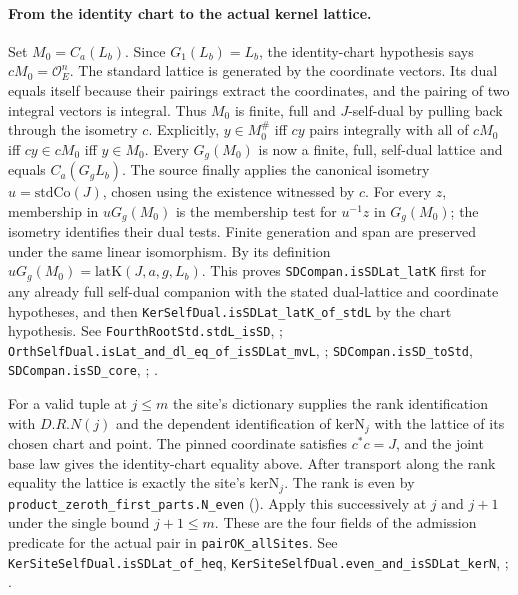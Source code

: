 \paragraph{From the identity chart to the actual kernel lattice.}\label{r15:site-standard}
Set $M_0=C_a(L_b)$. Since $G_1(L_b)=L_b$, the identity-chart hypothesis
says $cM_0=\mathcal O_E^n$. The standard lattice is generated by the
coordinate vectors. Its dual equals itself because their pairings extract
the coordinates, and the pairing of two integral vectors is integral.
Thus $M_0$ is finite, full and $J$-self-dual by pulling back through
the isometry $c$. Explicitly, $y\in M_0^\#$ iff $cy$ pairs integrally
with all of $cM_0$ iff $cy\in cM_0$ iff $y\in M_0$.
Every $G_g(M_0)$ is now a finite, full, self-dual lattice and equals
$C_a(G_gL_b)$. The source finally applies the canonical isometry
$u=\mathrm{stdCo}(J)$, chosen using the existence witnessed by $c$.
For every $z$, membership in $uG_g(M_0)$ is the membership test for
$u^{-1}z$ in $G_g(M_0)$; the isometry identifies their dual tests.
Finite generation and span are preserved under the same linear isomorphism.
By its definition $uG_g(M_0)=\mathrm{latK}(J,a,g,L_b)$. This proves
\nolinkurl{SDCompan.isSDLat_latK} first for any already full self-dual
companion with the stated dual-lattice and coordinate hypotheses, and
then \nolinkurl{KerSelfDual.isSDLat_latK_of_stdL} by the chart hypothesis.
See \nolinkurl{FourthRootStd.stdL_isSD}, ;
\nolinkurl{OrthSelfDual.isLat_and_dl_eq_of_isSDLat_mvL},
;
\nolinkurl{SDCompan.isSD_toStd}, \nolinkurl{SDCompan.isSD_core},
;
.

For a valid tuple at $j\le m$ the site's dictionary supplies the rank
identification with $D.R.N(j)$ and the dependent identification of
$\mathrm{kerN}_j$ with the lattice of its chosen chart and point.
The pinned coordinate satisfies $c^*c=J$, and the joint base law gives
the identity-chart equality above. After transport along the rank
equality the lattice is exactly the site's $\mathrm{kerN}_j$.
The rank is even by \nolinkurl{product_zeroth_first_parts.N_even} ().
Apply this successively at $j$ and $j+1$ under the single bound $j+1\le m$.
These are the four fields of the admission predicate for the actual pair
in \nolinkurl{pairOK_allSites}.
See \nolinkurl{KerSiteSelfDual.isSDLat_of_heq},
\nolinkurl{KerSiteSelfDual.even_and_isSDLat_kerN},
;
.

